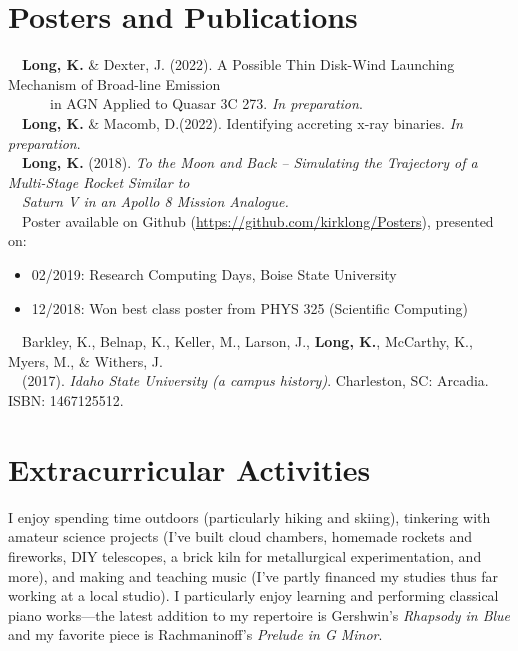 \documentclass[11pt]{article}
\begin{document}
\section{Posters and Publications}
\-\ \-\ \textbf{Long, K.} \& Dexter, J. (2022). A Possible Thin Disk-Wind Launching Mechanism of Broad-line Emission  \\
\-\ \-\ \-\ \-\ \-\ \-\ in AGN Applied to Quasar
3C 273. \textit{In preparation}.\vspace{1mm} \\
\-\ \-\ \textbf{Long, K.} \& Macomb, D.(2022). Identifying accreting x-ray binaries. \textit{In preparation}.\vspace{1mm} \\
\-\ \-\ \textbf{Long, K.} (2018). \textit{To the Moon and Back -- Simulating the Trajectory of a Multi-Stage Rocket Similar to} \\
\-\ \-\ \textit{Saturn V in an Apollo 8 Mission Analogue.}\vspace{1mm}\\
\-\ \-\ Poster available on Github (\url{https://github.com/kirklong/Posters}), presented on:
\-\ \-\ \begin{itemize}[noitemsep]
              \item 02/2019: Research Computing Days, Boise State University
              \item 12/2018: Won best class poster from PHYS 325 (Scientific Computing)
        \end{itemize}
\-\ \-\ Barkley, K., Belnap, K., Keller, M., Larson, J., \textbf{Long, K.}, McCarthy, K., Myers, M., \& Withers, J. \\
 \-\ \-\ (2017). \textit{Idaho State University (a campus history)}. Charleston, SC: Arcadia. ISBN: 1467125512.

\section{Extracurricular Activities}
I enjoy spending time outdoors (particularly hiking and skiing), tinkering with amateur science projects (I've built cloud chambers, homemade rockets and fireworks, DIY telescopes, a brick kiln for metallurgical experimentation, and more), and making and teaching music (I've partly financed my studies thus far working at a local studio). I particularly enjoy learning and performing classical piano works---the latest addition to my repertoire is Gershwin's \textit{Rhapsody in Blue} and my favorite piece is Rachmaninoff's \textit{Prelude in G Minor}.
\end{document}
